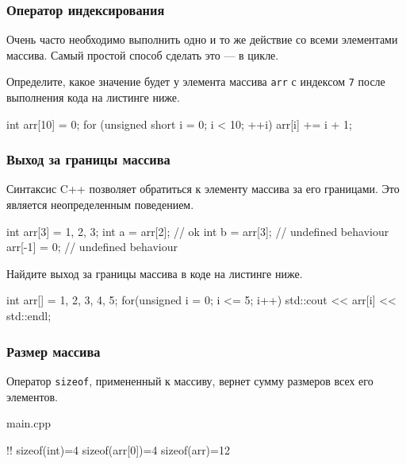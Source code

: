 \documentclass[compress, 8pt]{beamer}
\begin{document}
\begin{frame}[fragile]

    \frametitle{Оператор индексирования}

    Очень часто необходимо выполнить одно и то же действие
    со всеми элементами массива.
    Самый простой способ сделать это --- в цикле.

    \begin{task}
        Определите, какое значение будет у элемента массива \verb|arr|
        с индексом \verb|7| после выполнения кода на листинге ниже.
    \end{task}

    \begin{myinplacelisting}[minted language=cpp]
int arr[10] = {0};
for (unsigned short i = 0; i < 10; ++i) {
    arr[i] += i + 1;
}
    \end{myinplacelisting}

\end{frame}

\begin{frame}[fragile]

    \frametitle{Выход за границы массива}

    Синтаксис C++ позволяет обратиться к элементу массива за его
    границами.
    Это является неопределенным поведением\footnotemark{}.


    \begin{myinplacelisting}[minted language=cpp]
int arr[3] = {1, 2, 3};
int a = arr[2]; // ok
int b = arr[3]; // undefined behaviour
arr[-1] = 0; // undefined behaviour
    \end{myinplacelisting}

    \begin{task}
        Найдите выход за границы массива в коде на листинге ниже.
    \end{task}

    \begin{myinplacelisting}[minted language=cpp]
int arr[] = {1, 2, 3, 4, 5};
for(unsigned i = 0; i <= 5; i++) {
    std::cout << arr[i] << std::endl;
}
    \end{myinplacelisting}

\end{frame}

\begin{frame}[fragile]

    \frametitle{Размер массива}

    \hfill \break
    \hfill \break
    Оператор \verb|sizeof|, примененный к массиву, вернет сумму размеров
    всех его элементов.

        {main.cpp}

    \begin{terminalwindow}
!!
sizeof(int)=4
sizeof(arr[0])=4
sizeof(arr)=12
    \end{terminalwindow}

\end{frame}
\end{document}
